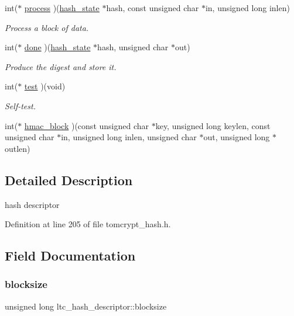 \begin{DoxyCompactItemize}
int($\ast$ \mbox{\hyperlink{structltc__hash__descriptor_a19f2fbd2b17d1fbe2e5497c54f70d52e}{process}} )(\mbox{\hyperlink{tomcrypt__hash_8h_af5d2e619794bf148fceb9332d3fcece6}{hash\+\_\+state}} $\ast$hash, const unsigned char $\ast$in, unsigned long inlen)
\begin{DoxyCompactList}\small\item\em Process a block of data. \end{DoxyCompactList}\item 
int($\ast$ \mbox{\hyperlink{structltc__hash__descriptor_a97978ff7b1c57c7e3c8b9a416f1226ed}{done}} )(\mbox{\hyperlink{tomcrypt__hash_8h_af5d2e619794bf148fceb9332d3fcece6}{hash\+\_\+state}} $\ast$hash, unsigned char $\ast$out)
\begin{DoxyCompactList}\small\item\em Produce the digest and store it. \end{DoxyCompactList}\item 
int($\ast$ \mbox{\hyperlink{structltc__hash__descriptor_ad31143932c117364e5c69cd7c3d62ef2}{test}} )(void)
\begin{DoxyCompactList}\small\item\em Self-\/test. \end{DoxyCompactList}\item 
int($\ast$ \mbox{\hyperlink{structltc__hash__descriptor_a550b85ae2a58081a1f1d0add6e51a3cf}{hmac\+\_\+block}} )(const unsigned char $\ast$key, unsigned long keylen, const unsigned char $\ast$in, unsigned long inlen, unsigned char $\ast$out, unsigned long $\ast$outlen)
\end{DoxyCompactItemize}


\subsection{Detailed Description}
hash descriptor 

Definition at line 205 of file tomcrypt\+\_\+hash.\+h.



\subsection{Field Documentation}
\mbox{\label{structltc__hash__descriptor_ad0ac47c32e536997b59a5571acae2251}} 
\subsubsection{\texorpdfstring{blocksize}{blocksize}}
{\footnotesize\ttfamily unsigned long ltc\+\_\+hash\+\_\+descriptor\+::blocksize}



